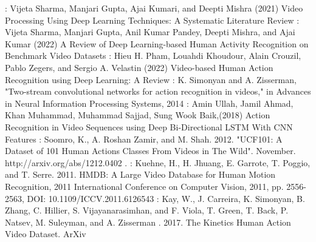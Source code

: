 \documentclass[twocolumn]{article}
\begin{document}
\begin{thebibliography}{00}
    : Vijeta Sharma, Manjari Gupta, Ajai Kumari, and Deepti Mishra (2021) Video Processing Using Deep Learning Techniques: A Systematic Literature Review
    : Vijeta Sharma, Manjari Gupta, Anil Kumar Pandey, Deepti Mishra, and Ajai Kumar (2022) A Review of Deep Learning-based Human Activity Recognition on Benchmark Video Datasets
    : Hieu H. Pham, Louahdi Khoudour, Alain Crouzil, Pablo Zegers, and Sergio A. Velastin (2022) Video-based Human Action Recognition using Deep Learning: A Review
    : K. Simonyan and A. Zisserman, "Two-stream convolutional networks for action recognition in videos," in Advances in Neural Information Processing Systems, 2014
    : Amin Ullah, Jamil Ahmad, Khan Muhammad, Muhammad Sajjad, Sung Wook Baik,(2018) Action Recognition in Video Sequences using Deep Bi-Directional LSTM With CNN Features
    : Soomro, K., A. Roshan Zamir, and M. Shah. 2012. "UCF101: A Dataset of 101 Human Actions Classes From Videos in The Wild". November. http://arxiv.org/abs/1212.0402 .
    : Kuehne, H., H. Jhuang, E. Garrote, T. Poggio, and T. Serre. 2011. HMDB: A Large Video Database for Human Motion Recognition, 2011 International Conference on Computer Vision, 2011, pp. 2556-2563, DOI: 10.1109/ICCV.2011.6126543
    : Kay, W., J. Carreira, K. Simonyan, B. Zhang, C. Hillier, S. Vijayanarasimhan, and F. Viola, T. Green, T. Back, P. Natsev, M. Suleyman, and A. Zisserman . 2017. The Kinetics Human Action Video Dataset. ArXiv
\end{thebibliography}
\end{document}
